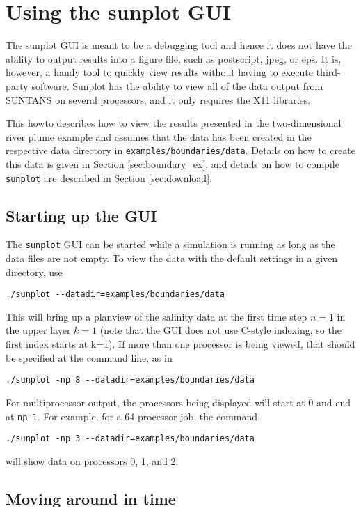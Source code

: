 \section{Using the sunplot GUI}

The sunplot GUI is meant to be a debugging tool and hence it does not have the ability to output
results into a figure file, such as postscript, jpeg, or eps.  It is, however, a handy tool to
quickly view results without having to execute third-party software.  Sunplot has the ability to
view all of the data output from SUNTANS on several processors, and it only requires the X11 libraries.

This howto describes how to view the results presented in the two-dimensional river plume
example and assumes that the data has been created in the respective data directory
in \verb+examples/boundaries/data+.  Details on how to create this data is given in 
Section \ref{sec:boundary_ex},
and details on how to compile \verb+sunplot+ are described in Section \ref{sec:download}.

\subsection{Starting up the GUI}

The \verb+sunplot+ GUI can be started while a simulation is running as long as the data files
are not empty.  To view the data with the default settings in a given directory, use
\begin{verbatim}
./sunplot --datadir=examples/boundaries/data
\end{verbatim}
This will bring up a planview of the salinity data at the first time step $n=1$ in the upper layer $k=1$ (note
that the GUI does not use C-style indexing, so the first index starts at k=1).  If more than one processor
is being viewed, that should be specified at the command line, as in
\begin{verbatim}
./sunplot -np 8 --datadir=examples/boundaries/data
\end{verbatim}
For multiprocessor output, the processors being displayed will start at 0 and end at \verb+np-1+. 
For example, for a 64 processor job, the command
\begin{verbatim}
./sunplot -np 3 --datadir=examples/boundaries/data
\end{verbatim}
will show data on processors 0, 1, and 2.

\subsection{Moving around in time}

